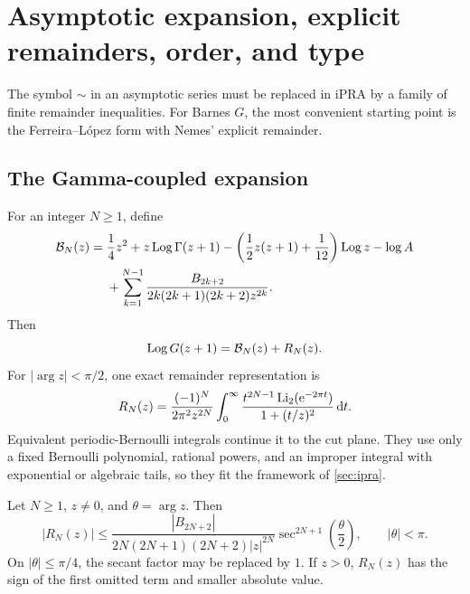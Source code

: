 \section{Asymptotic expansion, explicit remainders, order, and type}\label{sec:asymptotic}

The symbol \(\sim\) in an asymptotic series must be replaced in iPRA by a
family of finite remainder inequalities.  For Barnes $G$, the most convenient
starting point is the Ferreira--L\'opez form with Nemes' explicit remainder.

\subsection{The Gamma-coupled expansion}

For an integer \(N\ge1\), define
\begin{align}
 \mathcal B_N(z)={}&\frac14z^2+z\operatorname{Log}\Gamma(z+1)
 -\left(\frac12z(z+1)+\frac1{12}\right)\operatorname{Log} z-\log A\notag\\
 &+\sum_{k=1}^{N-1}
 \frac{B_{2k+2}}
 {2k(2k+1)(2k+2)z^{2k}}.
 \label{eq:FL-trunc}
\end{align}
Then
\begin{equation}\label{eq:FL-expansion}
 \operatorname{Log} G(z+1)=\mathcal B_N(z)+R_N(z).
\end{equation}
For \(|\arg z|<\pi/2\), one exact remainder representation is
\begin{equation}\label{eq:Nemes-remainder}
 R_N(z)=\frac{(-1)^N}{2\pi^2z^{2N}}
 \int_0^\infty
 \frac{t^{2N-1}\operatorname{Li}_2(\mathrm e^{-2\pi t})}
      {1+(t/z)^2}\,\mathrm d t.
\end{equation}
Equivalent periodic-Bernoulli integrals continue it to the cut plane.  They use
only a fixed Bernoulli polynomial, rational powers, and an improper integral
with exponential or algebraic tails, so they fit the framework of
\cref{sec:ipra}.

\begin{theorem}\label{thm:Nemes-bound}
Let \(N\ge1\), \(z\ne0\), and \(\theta=\arg z\).  Then
\begin{equation}\label{eq:Nemes-bound}
 |R_N(z)|\le
 \frac{|B_{2N+2}|}
 {2N(2N+1)(2N+2)|z|^{2N}}
 \sec^{2N+1}\!\left(\frac\theta2\right),
 \qquad |\theta|<\pi.
\end{equation}
On \(|\theta|\le\pi/4\), the secant factor may be replaced by \(1\).  If
\(z>0\), \(R_N(z)\) has the sign of the first omitted term and smaller absolute
value.
\end{theorem}

